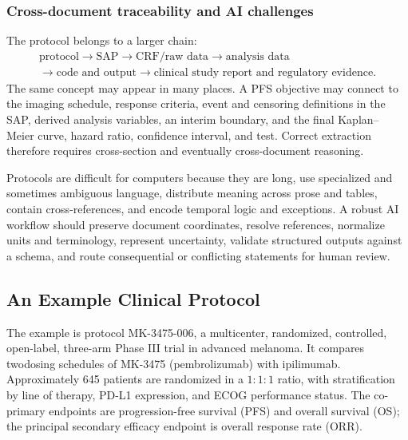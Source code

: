 \documentclass[12pt,oneside]{book}
\numberwithin{equation}{section}
\theoremstyle{definition}
\theoremstyle{plain}
\theoremstyle{remark}
\begin{document}
\subsubsection{Cross-document traceability and AI challenges}

The protocol belongs to a larger chain:
\[
\begin{gathered}
 \text{protocol}\rightarrow\text{SAP}\rightarrow\text{CRF/raw data}
 \rightarrow\text{analysis data}\\
 \rightarrow\text{code and output}\rightarrow
 \text{clinical study report and regulatory evidence}.
\end{gathered}
\]
The same concept may appear in many places.  A PFS objective may connect to the
imaging schedule, response criteria, event and censoring definitions in the
SAP, derived analysis variables, an interim boundary, and the final Kaplan--
Meier curve, hazard ratio, confidence interval, and test.  Correct extraction
therefore requires cross-section and eventually cross-document reasoning.

Protocols are difficult for computers because they are long, use specialized
and sometimes ambiguous language, distribute meaning across prose and tables,
contain cross-references, and encode temporal logic and exceptions.  A robust
AI workflow should preserve document coordinates, resolve references, normalize
units and terminology, represent uncertainty, validate structured outputs
against a schema, and route consequential or conflicting statements for human
review.

\subsection{An Example Clinical Protocol}

The example is protocol MK-3475-006, a multicenter, randomized, controlled, open-label, three-arm Phase III trial in advanced melanoma. It compares twodosing schedules of MK-3475 (pembrolizumab) with ipilimumab. Approximately 645 patients are randomized in a $1{:}1{:}1$ ratio, with stratification by line of therapy, PD-L1 expression, and ECOG performance status. The co-primary endpoints are progression-free survival (PFS) and overall survival (OS); the principal secondary efficacy endpoint is overall response rate (ORR).
\end{document}
